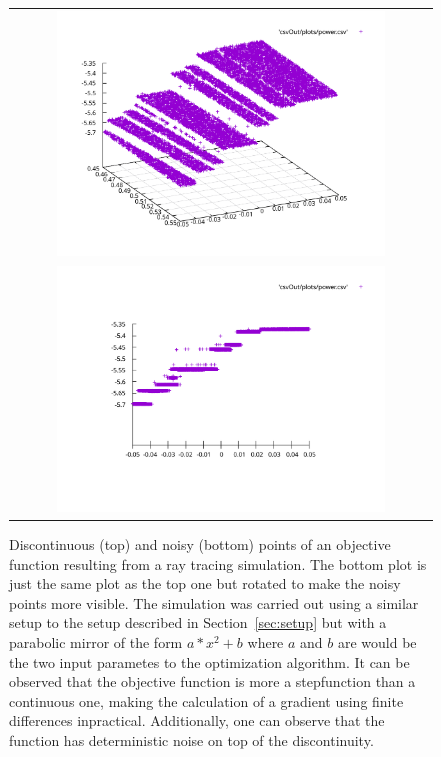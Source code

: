 \documentclass[a4paper,10pt]{article}
\newcommand{\secref}[1]{Section~\ref{#1}}
\begin{document}
    \begin{figure}
        \centering
        \begin{tabular}{c}
        \includegraphics[width=0.8\textwidth]{images/discontinuity.pdf} \\
        \includegraphics[width=0.8\textwidth]{images/noisyness.pdf}
        \end{tabular}
        \caption{
            Discontinuous (top) and noisy (bottom) points of an objective function
            resulting from a ray tracing simulation.
            The bottom plot is just the same plot as the top one but rotated
            to make the noisy points more visible.
            The simulation was carried out using a similar setup to the setup described
            in \secref{sec:setup} but with a parabolic mirror of the form
            $a*x^2 + b$ where $a$ and $b$ are would be the two input
            parametes to the optimization algorithm.
            It can be observed that the objective function is more a stepfunction than
            a continuous one, making the calculation of a gradient using
            finite differences inpractical.
            Additionally, one can observe that the function has deterministic noise 
            on top of the discontinuity.
        }
        \label{fig:opt_discontinuous}
    \end{figure}
\end{document}
